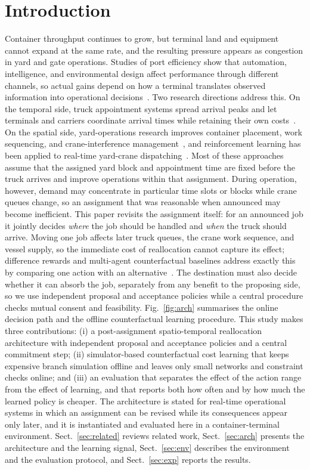 \documentclass[a4paper]{llncs}
\begin{document}
\section{Introduction}
\label{sec:intro}
Container throughput continues to grow, but terminal land and equipment
cannot expand at the same rate, and the resulting pressure appears as
congestion in yard and gate operations. Studies of port efficiency show
that automation, intelligence, and environmental design affect
performance through different channels, so actual gains depend on how a
terminal translates observed information into operational
decisions~\cite{ref1}. Two research directions address this. On the
temporal side, truck appointment systems spread arrival peaks and let
terminals and carriers coordinate arrival times while retaining their
own costs~\cite{ref4,ref6}. On the spatial side, yard-operations
research improves container placement, work sequencing, and
crane-interference management~\cite{ref7,ref8,ref9,ref16}, and
reinforcement learning has been applied to real-time yard-crane
dispatching~\cite{ref19}.
Most of these approaches assume that the assigned yard block and
appointment time are fixed before the truck arrives and improve
operations within that assignment. During operation, however, demand may
concentrate in particular time slots or blocks while crane queues
change, so an assignment that was reasonable when announced may become
inefficient. This paper revisits the assignment itself: for an announced
job it jointly decides \emph{where} the job should be handled and
\emph{when} the truck should arrive. Moving one job affects later truck
queues, the crane work sequence, and vessel supply, so the immediate
cost of reallocation cannot capture its effect; difference rewards and
multi-agent counterfactual baselines address exactly this by comparing
one action with an alternative~\cite{ref10,ref11}. The destination must
also decide whether it can absorb the job, separately from any benefit
to the proposing side, so we use independent proposal and acceptance
policies while a central procedure checks mutual consent and
feasibility. Fig.~\ref{fig:arch} summarises the online decision path and
the offline counterfactual learning procedure.
This study makes three contributions: (i) a post-assignment
spatio-temporal reallocation architecture with independent proposal and
acceptance policies and a central commitment step; (ii) simulator-based
counterfactual cost learning that keeps expensive branch simulation
offline and leaves only small networks and constraint checks online; and
(iii) an evaluation that separates the effect of the action range from
the effect of learning, and that reports both how often and by how much
the learned policy is cheaper. The architecture is stated for real-time operational systems in which
an assignment can be revised while its consequences appear only later,
and it is instantiated and evaluated here in a container-terminal
environment.
Sect.~\ref{sec:related} reviews related
work, Sect.~\ref{sec:arch} presents the architecture and the learning
signal, Sect.~\ref{sec:env} describes the environment and the evaluation
protocol, and Sect.~\ref{sec:exp} reports the results.
\end{document}
